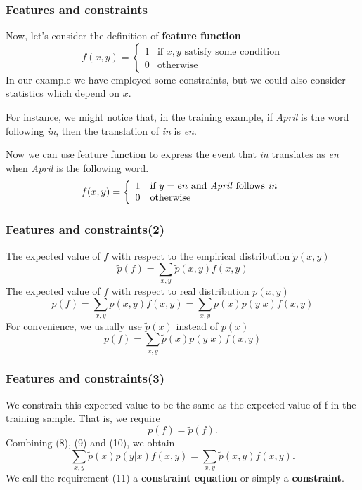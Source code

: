 \documentclass[slidestop,compress,mathserif]{beamer}
\begin{document}
	\begin{frame}
		\frametitle{Features and constraints}
		Now, let's consider the definition of \textbf{feature function}
		$$f(x,y)=\left\{
		\begin{array}{ll}
		1  &\mbox{if $x,y$ satisfy some condition}\\
		0  &\mbox{otherwise}
		\end{array}
		\right.
		$$
		In our example we have employed some constraints, but we could also consider statistics which depend on $x$.
		
		For instance, we might notice that, in the training example, if \textit{April} is the word following \textit{in}, then the translation of \textit{in} is \textit{en}.
		
		Now we can use feature function to express the event that \textit{in} translates as \textit{en} when \textit{April} is the following word.
		$$f(x,y)=\left\{
		\begin{array}{ll}
		1  &\mbox{if $y=en$ and \textit{April} follows \textit{in}}\\
		0  &\mbox{otherwise}
		\end{array}
		\right.
		$$
	\end{frame}
	
	\begin{frame}
		\frametitle{Features and constraints(2)}
		The expected value of $f$ with respect to the empirical distribution $\widetilde{p}(x,y)$
		\begin{equation}
			\widetilde{p}(f) = \sum_{x,y}\widetilde{p}(x,y)f(x,y)
		\end{equation}
		The expected value of $f$ with respect to real distribution $p(x,y)$
		\begin{equation*}
			p(f) = \sum_{x,y}p(x,y)f(x,y) = \sum_{x,y}p(x)p(y|x)f(x,y)
		\end{equation*}
		For convenience, we usually use $\widetilde{p}(x)$ instead of $p(x)$
		\begin{equation}
		p(f) = \sum_{x,y}\widetilde{p}(x)p(y|x)f(x,y)
		\end{equation}
	\end{frame}
	
	\begin{frame}
		\frametitle{Features and constraints(3)}
		We constrain this expected value to be the same as the expected value of f in the training sample. That is, we require
		\begin{equation}
			p(f) = \widetilde{p}(f). 
		\end{equation}
		Combining (8), (9) and (10), we obtain
		\begin{equation}
			\sum_{x,y}\widetilde{p}(x)p(y|x)f(x,y) = \sum_{x,y}\widetilde{p}(x,y)f(x,y).
		\end{equation}
		We call the requirement (11) a \textbf{constraint equation} or simply a \textbf{constraint}.
	\end{frame}
	
\end{document}
